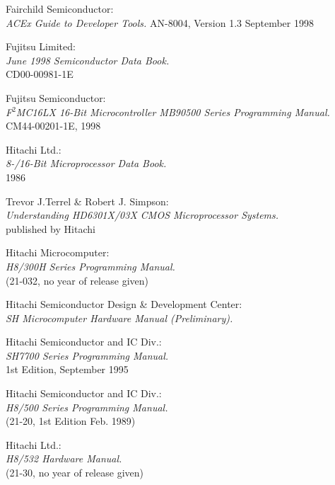 \documentclass[12pt,twoside]{report}
\begin{document}
\begin{thebibliography}{99}
 Fairchild Semiconductor: \\
                   {\em ACEx Guide to Developer Tools.\/}
                   AN-8004, Version 1.3 September 1998

 Fujitsu Limited: \\
                    {\em June 1998 Semiconductor Data Book.\/} \\
                    CD00-00981-1E

 Fujitsu Semiconductor: \\
                    {\em F$^2$MC16LX 16-Bit Microcontroller MB90500 Series
                         Programming Manual.\/} \\
                    CM44-00201-1E, 1998

 Hitachi Ltd.: \\
                 {\em 8-/16-Bit Microprocessor Data Book.\/} \\
                 1986

 Trevor J.Terrel \& Robert J. Simpson: \\
                {\em Understanding HD6301X/03X CMOS Microprocessor
                 Systems.\/} \\
		published by Hitachi

 Hitachi Microcomputer: \\
                {\em H8/300H Series Programming Manual.\/} \\
                (21-032, no year of release given)

 Hitachi Semiconductor Design \& Development Center: \\
                 {\em SH Microcomputer Hardware Manual
                 (Preliminary).\/}

 Hitachi Semiconductor and IC Div.: \\
                 {\em SH7700 Series Programming Manual.\/} \\
                 1st Edition, September 1995

 Hitachi Semiconductor and IC Div.: \\
                  {\em H8/500 Series Programming Manual.\/} \\
        	  (21-20, 1st Edition Feb. 1989)

 Hitachi Ltd.: \\
                    {\em H8/532 Hardware Manual.\/} \\
		    (21-30, no year of release given)


\end{thebibliography}
\end{document}
